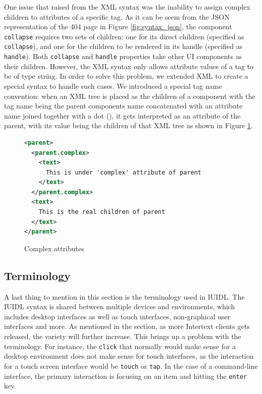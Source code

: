 One issue that raised from the XML syntax was the inability to assign complex children to attributes of a specific tag. As it can be seem from the JSON representation of the 404 page in Figure \ref{fig:syntax_json}, the component \texttt{collapse} requires two sets of children: one for its direct children (specified as \texttt{collapse}), and one for the children to be rendered in its handle (specified as \texttt{handle}). Both \texttt{collapse} and \texttt{handle} properties take other UI components as their children. However, the XML syntax only allows attribute values of a tag to be of type string. In order to solve this problem, we extended XML to create a special syntax to handle such cases. We introduced a special tag name convention: when an XML tree is placed as the children of a component with the tag name being the parent components name concatenated with an attribute name joined together with a dot (), it gets interpreted as an attribute of the parent, with its value being the children of that XML tree as shown in Figure \ref{fig:complex_attributes}.

\begin{figure}
\begin{minipage}{\linewidth}
\begin{lstlisting}[language=xml]
<parent>
  <parent.complex>
    <text>
      This is under 'complex' attribute of parent
    </text>
  </parent.complex>
  <text>
    This is the real children of parent
  </text>
</parent>
\end{lstlisting}
\end{minipage}
\caption{Complex attributes}%
\label{fig:complex_attributes}%
\end{figure}


\subsection{Terminology}

A last thing to mention in this section is the terminology used in IUIDL. The IUIDL syntax is shared between multiple devices and environments, which includes desktop interfaces as well as touch interfaces, non-graphical user interfaces and more. As mentioned in the  section, as more Intertext clients gets released, the variety will further increase. This brings up a problem with the terminology. For instance, the \texttt{click} that normally would make sense for a desktop environment does not make sense for touch interfaces, as the interaction for a touch screen interface would be \texttt{touch} or \texttt{tap}. In the case of a command-line interface, the primary interaction is focusing on an item and hitting the \texttt{enter} key. 

